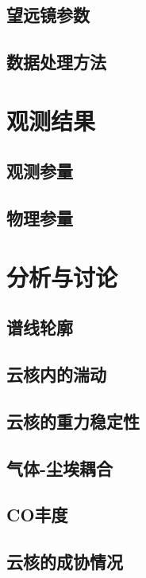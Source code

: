 \documentclass[UTF8]{pkuthss}
\begin{document}
	\section{望远镜参数}
	\section{数据处理方法}
\chapter{观测结果}
	\section{观测参量}
	\section{物理参量}
\chapter{分析与讨论}
	\section{谱线轮廓}
	\section{云核内的湍动}
	\section{云核的重力稳定性}
	\section{气体-尘埃耦合}
	\section{CO丰度}
	\section{云核的成协情况}
	\appendix
	\printbibliography[
		heading = bibintoc,
	]
\iffalse
\end{document}
